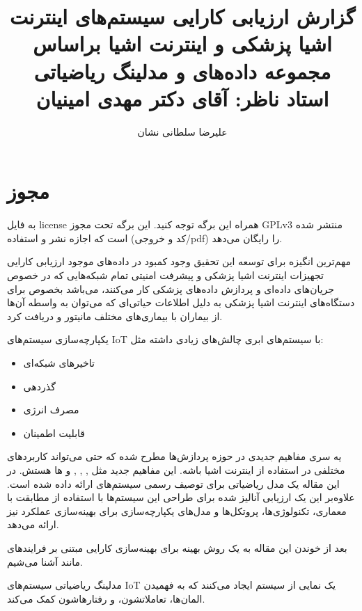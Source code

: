 \documentclass[a4paper]{article}
\title{گزارش ارزیابی کارایی سیستم‌های اینترنت اشیا پزشکی و اینترنت اشیا براساس
مجموعه داده‌های \lr{CICIoMT2024} و مدلینگ ریاضیاتی \\ استاد ناظر: آقای دکتر مهدی
امینیان}
\author{علیرضا سلطانی نشان}
\begin{document}
\maketitle

\section*{مجوز}

به فایل license همراه این برگه توجه کنید. این برگه تحت مجوز GPLv3 منتشر شده است
که اجازه نشر و استفاده (کد و خروجی/pdf) را رایگان می‌دهد.

\tableofcontents
\listoffigures
\listoftables

مهم‌ترین انگیزه برای توسعه این تحقیق وجود کمبود در داده‌های موجود ارزیابی کارایی
تجهیزات اینترنت اشیا پزشکی و پیشرفت امنیتی تمام شبکه‌هایی که در خصوص جریان‌های
داده‌ای و پردازش داده‌های پزشکی کار می‌کنند، می‌باشد بخصوص برای دستگاه‌های
اینترنت اشیا پزشکی به دلیل اطلاعات حیاتی‌ای که می‌توان به واسطه آن‌ها از بیماران
با بیماری‌های مختلف مانیتور و دریافت کرد.

\newpage

یکپارچه‌سازی سیستم‌های IoT با سیستم‌های ابری چالش‌های زیادی داشته مثل:

\begin{itemize}
    \item تاخیر‌های شبکه‌ای
    \item گذردهی
    \item مصرف انرژی
    \item قابلیت اطمینان
\end{itemize}

یه سری مفاهیم جدیدی در حوزه پردازش‌ها مطرح شده که حتی می‌تواند کاربرد‌های مختلفی
در استفاده از اینترنت اشیا باشه. این مفاهیم جدید مثل ,
, ,  و
 ‌ها هستش.  در این مقاله یک مدل ریاضیاتی برای توصیف رسمی سیستم‌های
 ارائه داده شده است.  علاوه‌بر این یک ارزیابی آنالیز شده برای طراحی این
سیستم‌ها با استفاده از مطابقت با معماری، تکنولوژی‌ها، پروتکل‌ها و مدل‌های
یکپارچه‌سازی برای بهینه‌سازی عملکرد نیز ارائه می‌دهد.


بعد از خوندن این مقاله به یک روش بهینه برای بهینه‌سازی کارایی مبتنی بر
فرایند‌های  مانند  آشنا می‌شیم.

مدلینگ ریاضیاتی سیستم‌های IoT یک نمایی از سیستم ایجاد می‌کنند که به فهمیدن
المان‌ها، تعاملاتشون، و رفتار‌هاشون کمک می‌کند.
\end{document}
